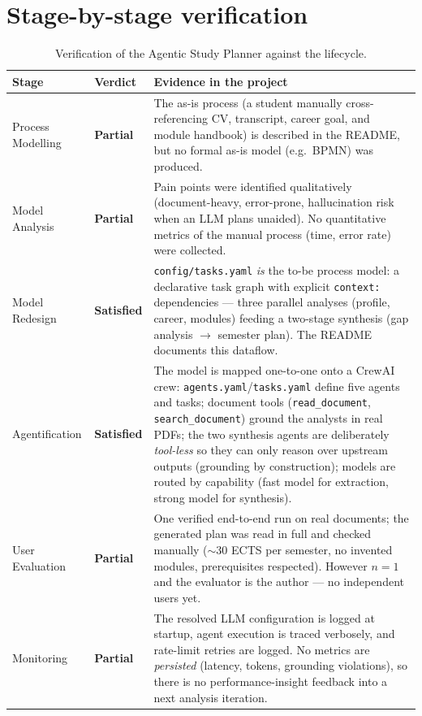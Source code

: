 \documentclass[11pt,a4paper]{article}
\newcommand{\satisfied}{\textcolor{okgreen}{\textbf{Satisfied}}}
\newcommand{\partialk}{\textcolor{partialorange}{\textbf{Partial}}}
\begin{document}
\section{Stage-by-stage verification}

\begin{table}[h]
\centering
\small
\begin{tabular}{@{}p{2.6cm}p{1.7cm}p{9.6cm}@{}}
\toprule
\textbf{Stage} & \textbf{Verdict} & \textbf{Evidence in the project} \\
\midrule
Process Modelling & \partialk &
The as-is process (a student manually cross-referencing CV, transcript,
career goal, and module handbook) is described in the README, but no formal
as-is model (e.g.\ BPMN) was produced. \\
\addlinespace
Model Analysis & \partialk &
Pain points were identified qualitatively (document-heavy, error-prone,
hallucination risk when an LLM plans unaided). No quantitative metrics of the
manual process (time, error rate) were collected. \\
\addlinespace
Model Redesign & \satisfied &
\texttt{config/tasks.yaml} \emph{is} the to-be process model: a declarative
task graph with explicit \texttt{context:} dependencies --- three parallel
analyses (profile, career, modules) feeding a two-stage synthesis (gap
analysis $\rightarrow$ semester plan). The README documents this dataflow. \\
\addlinespace
Agentification & \satisfied &
The model is mapped one-to-one onto a CrewAI crew:
\texttt{agents.yaml}/\texttt{tasks.yaml} define five agents and tasks;
document tools (\texttt{read\_document}, \texttt{search\_document}) ground the
analysts in real PDFs; the two synthesis agents are deliberately
\emph{tool-less} so they can only reason over upstream outputs (grounding by
construction); models are routed by capability (fast model for extraction,
strong model for synthesis). \\
\addlinespace
User Evaluation & \partialk &
One verified end-to-end run on real documents; the generated plan was read in
full and checked manually ($\sim$30 ECTS per semester, no invented modules,
prerequisites respected). However $n{=}1$ and the evaluator is the author ---
no independent users yet. \\
\addlinespace
Monitoring & \partialk &
The resolved LLM configuration is logged at startup, agent execution is
traced verbosely, and rate-limit retries are logged. No metrics are
\emph{persisted} (latency, tokens, grounding violations), so there is no
performance-insight feedback into a next analysis iteration. \\
\bottomrule
\end{tabular}
\caption{Verification of the Agentic Study Planner against the lifecycle.}
\label{tab:verification}
\end{table}
\end{document}
